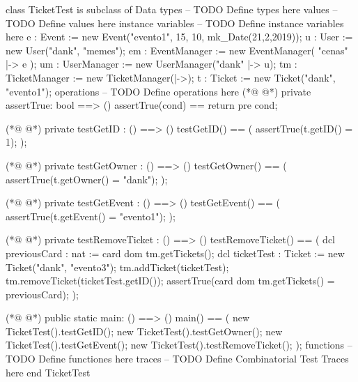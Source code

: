 \begin{vdmpp}[breaklines=true]
class TicketTest is subclass of Data
types
-- TODO Define types here
values
-- TODO Define values here
instance variables
-- TODO Define instance variables here
 e : Event := new Event("evento1", 15, 10, mk_Date(21,2,2019));
 u : User := new User("dank", "memes");
 em : EventManager := new EventManager({ "cenas" |-> e });
 um : UserManager := new UserManager({"dank" |-> u});
 tm : TicketManager := new TicketManager({|->});
 t : Ticket := new Ticket("dank", "evento1");
operations
-- TODO Define operations here
(*@
\label{assertTrue:16}
@*)
 private assertTrue: bool ==> ()
  assertTrue(cond) == return
  pre cond;
  
(*@
\label{testGetID:20}
@*)
 private testGetID : () ==> ()
 testGetID() == (
  assertTrue(t.getID() = 1);
 );
 
(*@
\label{testGetOwner:25}
@*)
 private testGetOwner : () ==> ()
 testGetOwner() == (
  assertTrue(t.getOwner() = "dank");
 );
 
(*@
\label{testGetEvent:30}
@*)
 private testGetEvent : () ==> ()
 testGetEvent() == (
  assertTrue(t.getEvent() = "evento1");
 );
 
(*@
\label{testRemoveTicket:35}
@*)
 private testRemoveTicket : () ==> ()
 testRemoveTicket() == (
  dcl previousCard : nat := card dom tm.getTickets();
  dcl ticketTest : Ticket := new Ticket("dank", "evento3");
  tm.addTicket(ticketTest);
  tm.removeTicket(ticketTest.getID());
  assertTrue(card dom tm.getTickets() = previousCard);
 );
 
(*@
\label{main:44}
@*)
 public static main: () ==> ()
 main() == (
  new TicketTest().testGetID();
  new TicketTest().testGetOwner();
  new TicketTest().testGetEvent();
  new TicketTest().testRemoveTicket();
 );
functions
-- TODO Define functiones here
traces
-- TODO Define Combinatorial Test Traces here
end TicketTest
\end{vdmpp}
